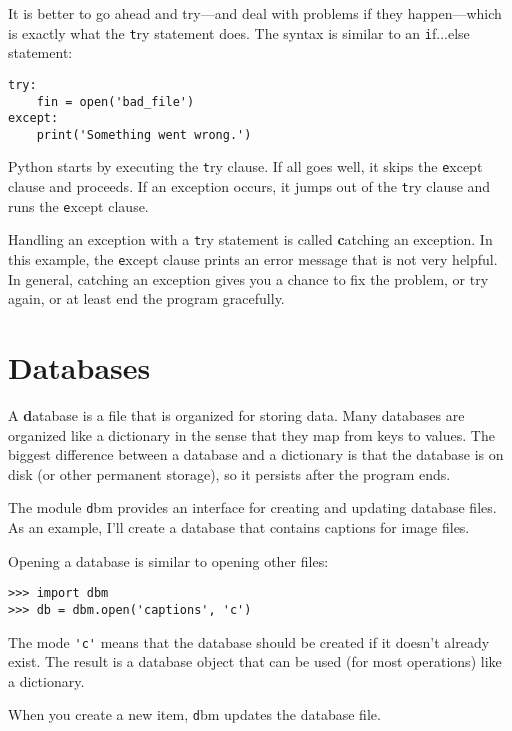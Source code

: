 \documentclass[
DIV=11,
fontsize=13,
twoside,
headinclude=false,
titlepage=firstiscover,
abstract=true,
headsepline=true,
footsepline=true,
chapterprefix=true, %
headings=big,
bibliography=totoc,%
captions=tableheading
]{scrbook}
\theoremstyle{definition}
\begin{document}
It is better to go ahead and try---and deal with problems if they
happen---which is exactly what the {\texttt try} statement does.  The
syntax is similar to an {\texttt if...else} statement:

\begin{lstlisting}
try:    
    fin = open('bad_file')
except:
    print('Something went wrong.')
\end{lstlisting}
%
Python starts by executing the {\texttt try} clause.  If all goes
well, it skips the {\texttt except} clause and proceeds.  If an
exception occurs, it jumps out of the {\texttt try} clause and
runs the {\texttt except} clause.

Handling an exception with a {\texttt try} statement is called {\textbf
catching} an exception.  In this example, the {\texttt except} clause
prints an error message that is not very helpful.  In general,
catching an exception gives you a chance to fix the problem, or try
again, or at least end the program gracefully.


\section{Databases}

A {\textbf database} is a file that is organized for storing data.  Many
databases are organized like a dictionary in the sense that they map
from keys to values.  The biggest difference between a database and a
dictionary is that the database is on disk (or other permanent
storage), so it persists after the program ends.   

The module {\texttt dbm} provides an interface for creating
and updating database files.
As an example, I'll create a database
that contains captions for image files.

Opening a database is similar to opening other files:

\begin{lstlisting}
>>> import dbm
>>> db = dbm.open('captions', 'c')
\end{lstlisting}
%
The mode \verb"'c'" means that the database should be created if
it doesn't already exist.  The result is a database object
that can be used (for most operations) like a dictionary.

When you create a new item, {\texttt dbm} updates the database file.
\end{document}
